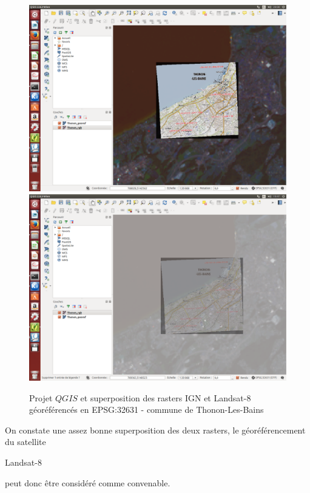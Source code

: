 \documentclass{book}
\begin{document}
\begin{figure}[H]
\begin{center}
\includegraphics[scale=0.3]{images/georeferencing/qgis-superposition0.png}
\includegraphics[scale=0.3]{images/georeferencing/qgis-superposition.png}
\end{center}
\caption{Projet $QGIS$ et superposition des rasters IGN et Landsat-8 géoréférencés en EPSG:32631 - commune de Thonon-Les-Bains}
\label{qgis_super}
\end{figure}

\clearpage

On constate une assez bonne superposition des deux rasters, le géoréférencement du satellite \begin{itshape}Landsat-8\end{itshape} peut
 donc \^{e}tre considéré comme convenable.
\end{document}
